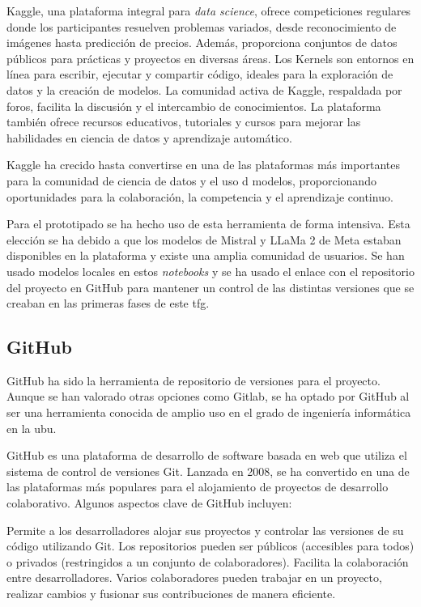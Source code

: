 Kaggle, una plataforma integral para \textit{data science}, ofrece competiciones regulares donde los participantes resuelven problemas variados, desde reconocimiento de imágenes hasta predicción de precios. Además, proporciona conjuntos de datos públicos para prácticas y proyectos en diversas áreas. Los Kernels son entornos en línea para escribir, ejecutar y compartir código, ideales para la exploración de datos y la creación de modelos. La comunidad activa de Kaggle, respaldada por foros, facilita la discusión y el intercambio de conocimientos. La plataforma también ofrece recursos educativos, tutoriales y cursos para mejorar las habilidades en ciencia de datos y aprendizaje automático.

Kaggle ha crecido hasta convertirse en una de las plataformas más importantes para la comunidad de ciencia de datos y el uso d modelos, proporcionando oportunidades para la colaboración, la competencia y el aprendizaje continuo.

Para el prototipado se ha hecho uso de esta herramienta de forma intensiva. Esta elección se ha debido a que los modelos de Mistral y LLaMa 2 de Meta estaban disponibles en la plataforma y existe una amplia comunidad de usuarios. Se han usado modelos locales en estos \textit{notebooks} y se ha usado el enlace con el repositorio del proyecto en GitHub para mantener un control de las distintas versiones que se creaban en las primeras fases de este \acrshort{tfg}.

\subsection{GitHub}

GitHub ha sido la herramienta de repositorio de versiones para el proyecto. Aunque se han valorado otras opciones como Gitlab, se ha optado por GitHub al ser una herramienta conocida de amplio uso en el grado de ingeniería informática en la \acrshort{ubu}.

GitHub es una plataforma de desarrollo de software basada en web que utiliza el sistema de control de versiones Git. Lanzada en 2008, se ha convertido en una de las plataformas más populares para el alojamiento de proyectos de desarrollo colaborativo. Algunos aspectos clave de GitHub incluyen:

Permite a los desarrolladores alojar sus proyectos y controlar las versiones de su código utilizando Git. Los repositorios pueden ser públicos (accesibles para todos) o privados (restringidos a un conjunto de colaboradores). Facilita la colaboración entre desarrolladores. Varios colaboradores pueden trabajar en un proyecto, realizar cambios y fusionar sus contribuciones de manera eficiente.

